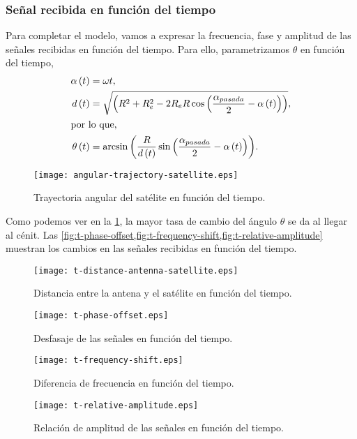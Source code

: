 \documentclass{article}
\newenvironment{standalone}{\begin{preview}}{\end{preview}}
\begin{document}
\begin{standalone}
  \subsubsection{Señal recibida en función del tiempo}

  Para completar el modelo, vamos a expresar la frecuencia, fase y amplitud de las señales recibidas en función del tiempo.
  Para ello, parametrizamos $\theta$ en función del tiempo,
  \begin{align}
    \alpha \left( t \right) &= \omega t, \\
    d \left( t \right) &= \sqrt{ \left( R^2 + R_e^2 - 2 R_e R \cos{ \left( \frac{\alpha_{pasada}}{2} - \alpha \left( t \right) \right) } \right) }, \\
    \intertext{por lo que,}
    \theta \left( t \right) &= \arcsin{ \left( \frac{R}{d \left( t \right) } \sin{ \left( \frac{\alpha_{pasada}}{2} - \alpha \left( t \right) \right) } \right) }.
  \end{align}

  \begin{figure}[!htbp]
    \centering
    \texttt{[image: angular-trajectory-satellite.eps]}
    \caption{Trayectoria angular del satélite en función del tiempo.}
    \label{fig:angular-trajectory-satellite}
  \end{figure}

  Como podemos ver en la \cref{fig:angular-trajectory-satellite}, la mayor tasa de cambio del ángulo $\theta$ se da al llegar al cénit.
  Las \cref{fig:t-phase-offset,fig:t-frequency-shift,fig:t-relative-amplitude} muestran los cambios en las señales recibidas en función del tiempo.

  \begin{figure}[!htbp]
    \centering
    \texttt{[image: t-distance-antenna-satellite.eps]}
    \caption{Distancia entre la antena y el satélite en función del tiempo.}
    \label{fig:t-distance-antenna-satellite}
  \end{figure}

  \begin{figure}[!htbp]
    \centering
    \texttt{[image: t-phase-offset.eps]}
    \caption{Desfasaje de las señales en función del tiempo.}
    \label{fig:t-phase-offset}
  \end{figure}

  \begin{figure}[!htbp]
    \centering
    \texttt{[image: t-frequency-shift.eps]}
    \caption{Diferencia de frecuencia en función del tiempo.}
    \label{fig:t-frequency-shift}
  \end{figure}

  \begin{figure}[!htbp]
    \centering
    \texttt{[image: t-relative-amplitude.eps]}
    \caption{Relación de amplitud de las señales en función del tiempo.}
    \label{fig:t-relative-amplitude}
  \end{figure}

\end{standalone}
\end{document}
